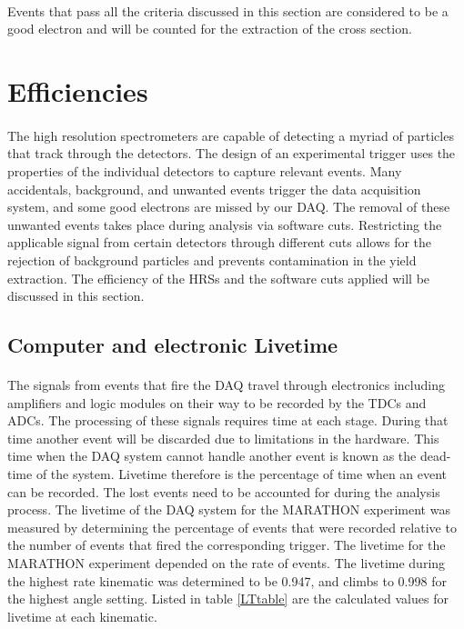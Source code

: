 \paragraph{}Events that pass all the criteria discussed in this section are considered to be a good electron and will be counted for the extraction of the cross section. 

\section{Efficiencies}\label{effs}
\paragraph{}The high resolution spectrometers are capable of detecting a myriad of particles that track through the detectors. The design of an experimental trigger uses the properties of the individual detectors to capture relevant events. Many accidentals, background, and unwanted events trigger the data acquisition system, and some good electrons are missed by our DAQ. The removal of these unwanted events takes place during analysis via software cuts. Restricting the applicable signal from certain detectors through different cuts allows for the rejection of background particles and prevents contamination in the yield extraction. The efficiency of the HRSs and the software cuts applied will be discussed in this section.  

\subsection{Computer and electronic Livetime}
\paragraph{}The signals from events that fire the DAQ travel through electronics including amplifiers and logic modules on their way to be recorded by the TDCs and ADCs. The processing of these signals requires time at each stage. During that time another event will be discarded due to limitations in the hardware. This time when the DAQ system cannot handle another event is known as the dead-time of the system. Livetime therefore is the percentage of time when an event can be recorded. The lost events need to be accounted for during the analysis process. The livetime of the DAQ system for the MARATHON experiment was measured by determining the percentage of events that were recorded relative to the number of events that fired the corresponding trigger. The livetime for the MARATHON experiment depended on the rate of events. The livetime during the highest rate kinematic was determined to be 0.947, and climbs to 0.998 for the highest angle setting. Listed in table \ref{LTtable} are the calculated values for livetime at each kinematic. 

